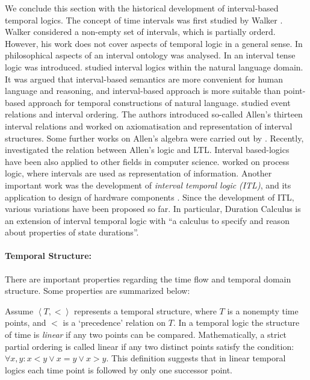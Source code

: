 \documentclass[11pt]{article}
\begin{document}
We conclude this section with the historical development of interval-based temporal logics. The concept of time intervals was first studied by Walker \cite{Wal47}. Walker considered a non-empty set of intervals, which is partially orderd. However, his work does not cover aspects of temporal logic in a general sense. In \cite{Ham71}  philosophical aspects of an interval ontology was analysed. In \cite{Hum79} an interval tense logic was introduced. 
 \cite{Dow79,Kam79,Rop80,Bur82,vB83,Gal84,Sim87} studied interval logics within the natural language domain. 
 It was argued that interval-based semantics are more convenient for human language and reasoning, and 
interval-based approach is more suitable than point-based approach for temporal constructions of natural language.
\cite{All83,All84,AH89,AF94} studied event relations and interval ordering. The authors introduced so-called Allen's thirteen interval relations and worked on axiomatisation and representation of interval structures.  Some further works on Allen's algebra were carried out by \cite{Lad87,Gal90}. Recently, \cite{RB06} investigated the relation between Allen's logic and LTL. Interval based-logics have been also applied to other fields in computer science. \cite{Par78,Pra79,HPS83} worked on process logic, where intervals are used as representation of information. Another important work was the development of \emph{interval temporal logic} \emph{(ITL)}, and its application to design of hardware components \cite{Mos83,HMM83}. Since the development of  ITL, various variations have been proposed so far. In particular, Duration Calculus \cite{CH04} is an extension of interval temporal logic with ``a calculus to specify and reason about properties of state durations''.


\paragraph{Temporal Structure:} There are important properties regarding the time flow and temporal domain structure. Some properties are summarized below:

Assume  $\left\langle T,<\right\rangle$ represents a temporal structure, where $T$ is a nonempty time points, and $<$ is a `precedence' relation on $T$. In a temporal logic the structure of time is \emph{linear} if any two points can be compared. Mathematically, a strict partial ordering is called linear if any two distinct points satisfy the condition: $\forall x,y:x<y\vee x=y\vee x>y$. This definition suggests that in linear temporal logics each time point is followed by only one successor point. 
\end{document}
